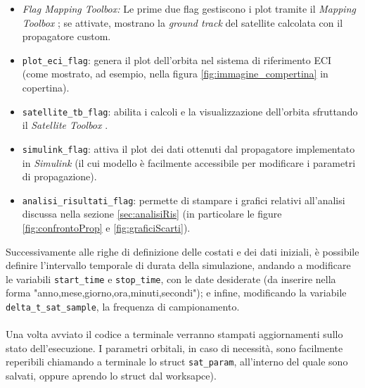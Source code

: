 \documentclass[12pt, a4paper]{article}
\begin{document}
\begin{itemize}
    \item \textit{Flag Mapping Toolbox:} Le prime due flag gestiscono i plot tramite il \textit{Mapping Toolbox} \cite{MappingToolbox}; se attivate, mostrano la \textit{ground track} del satellite calcolata con il propagatore custom.
    \item \texttt{plot\_eci\_flag}: genera il plot dell'orbita nel sistema di riferimento ECI (come mostrato, ad esempio, nella figura \ref{fig:immagine_compertina} in copertina).
    \item \texttt{satellite\_tb\_flag}: abilita i calcoli e la visualizzazione dell'orbita sfruttando il \textit{Satellite Toolbox} \cite{SatelliteCommunication}.
    \item \texttt{simulink\_flag}: attiva il plot dei dati ottenuti dal propagatore implementato in \textit{Simulink} (il cui modello è facilmente accessibile per modificare i parametri di propagazione).
    \item \texttt{analisi\_risultati\_flag}: permette di stampare i grafici relativi all'analisi discussa nella sezione \ref{sec:analisiRis} (in particolare le figure \ref{fig:confrontoProp} e \ref{fig:graficiScarti}).
\end{itemize}

Successivamente alle righe di definizione delle costati e dei dati iniziali, è possibile definire l'intervallo temporale di durata della simulazione, andando a modificare le variabili \texttt{start\_time} e \texttt{stop\_time}, con le date desiderate (da inserire nella forma "anno,mese,giorno,ora,minuti,secondi"); e infine, modificando la variabile \texttt{delta\_t\_sat\_sample}, la frequenza di campionamento.\\
\\
Una volta avviato il codice a terminale verranno stampati aggiornamenti sullo stato dell'esecuzione.
I parametri orbitali, in caso di necessità, sono facilmente reperibili chiamando a terminale  lo struct \texttt{sat\_param}, all'interno del quale sono salvati, oppure aprendo lo struct dal worksapce). 


 
 
\newpage
\printbibliography
\end{document}
